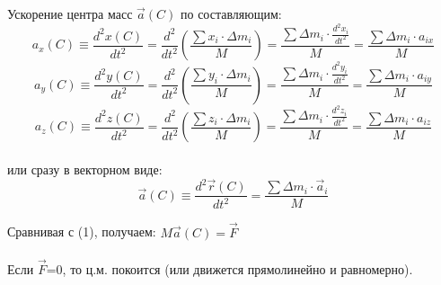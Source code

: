 \documentclass[12pt,epsfig,color,russian]{article}
\begin{document}
Ускорение центра масс $\vec{a}(C)$ по составляющим:
\begin{displaymath}
a_x(C) \equiv \frac{d^2x(C)}{dt^2}
=\frac{d^2}{dt^2}\left(\frac{\sum x_i\cdot\Delta m_i}M\right)
=\frac{\sum \Delta m_i\cdot\frac{d^2x_i}{dt^2}}M
=\frac{\sum \Delta m_i\cdot a_{ix}}M
\end{displaymath}
\begin{displaymath}
a_y(C) \equiv \frac{d^2y(C)}{dt^2}
=\frac{d^2}{dt^2}\left(\frac{\sum y_i\cdot\Delta m_i}M\right)
=\frac{\sum \Delta m_i\cdot\frac{d^2y_i}{dt^2}}M
=\frac{\sum \Delta m_i\cdot a_{iy}}M
\end{displaymath}
\begin{displaymath}
a_z(C) \equiv \frac{d^2z(C)}{dt^2}
=\frac{d^2}{dt^2}\left(\frac{\sum z_i\cdot\Delta m_i}M\right)
=\frac{\sum \Delta m_i\cdot\frac{d^2z_i}{dt^2}}M
=\frac{\sum \Delta m_i\cdot a_{iz}}M
\end{displaymath}\\
или сразу в векторном виде:
\begin{displaymath}
\vec{a}(C) \equiv \frac{d^2\vec{r}(C)}{dt^2}
=\frac{\sum \Delta m_i\cdot \vec{a}_{i}}M
\end{displaymath}

Сравнивая с (1), получаем: \hspace{10mm}$M\vec{a}(C) =\vec{F}$
\\[3mm]
\\[1mm]

Если $\vec{F}$=0, то ц.м. покоится (или движется прямолинейно и равномерно).
\end{document}
